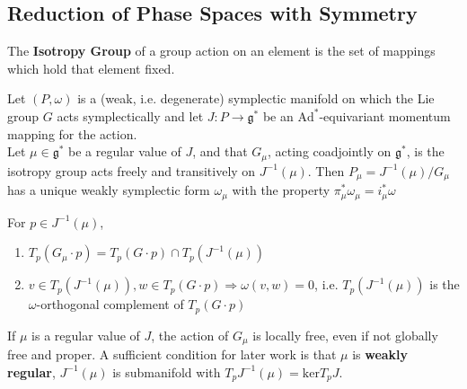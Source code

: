 \subsection{Reduction of Phase Spaces with Symmetry}

\begin{defn}

The \textbf{Isotropy Group} of a group action on an element is the set of mappings which hold that element fixed.

\end{defn}

\begin{thm} \label{thm:1}

Let $(P,\omega)$ is a (weak, i.e. degenerate) symplectic manifold on which the Lie group $G$ acts symplectically and let $J:P \to \mathfrak{g}^*$ be an $\mathrm{Ad}^*$-equivariant momentum mapping for the action. \\
\indent Let $\mu \in \mathfrak{g}^*$ be a regular value of $J$, and that $G_{\mu}$, acting coadjointly on $\mathfrak{g}^*$, is the isotropy group acts freely and transitively on $J^{-1}(\mu)$. Then $P_{\mu} = J^{-1}(\mu) / G_{\mu} $ has a unique weakly symplectic form $\omega_{\mu}$ with the property
$\pi^*_{\mu}\omega_{\mu} = i^*_{\mu} \omega$
\end{thm}

\begin{lem}\label{lem:1}

For $p \in J^{-1}(\mu)$,
\begin{enumerate}
    \item $T_p(G_\mu \cdot p) = T_p(G \cdot p) \cap T_p(J^{-1}(\mu))$
    \item $v \in T_p(J^{-1}(\mu)), w \in T_p(G \cdot p) \Rightarrow \omega(v,w)=0$, i.e. $T_p(J^{-1}(\mu))$ is the $\omega$-orthogonal complement of $T_p(G \cdot p)$
\end{enumerate}
\end{lem}

\begin{rmk}

If $\mu$ is a regular value of $J$, the action of $G_{\mu}$ is locally free, even if not globally free and proper. A sufficient condition for later work is that $\mu$ is \textbf{weakly regular}, $J^{-1}(\mu)$ is submanifold with $T_pJ^{-1}(\mu) = \mathrm{ker}T_p J$.
\end{rmk}

